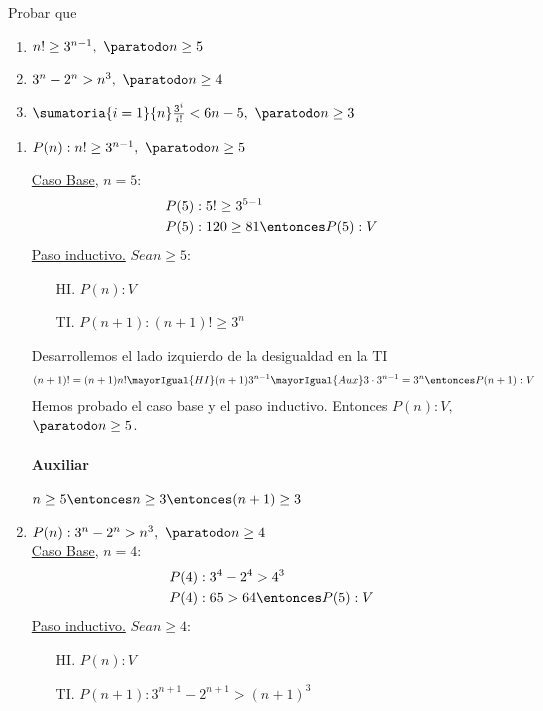\begin{enunciado}{\ejercicio}
  Probar que
  \begin{enumerate}[label=\roman*)]
    \item $n! \geq 3^{n-1}, \ \paratodo n \geq 5$
    \item $3^n - 2^n > n^3, \ \paratodo n \geq 4$
    \item $ \sumatoria{i=1}{n} \frac{3^i}{i!} < 6n - 5, \ \paratodo n \geq 3$
  \end{enumerate}
\end{enunciado}

\begin{enumerate}[label=\roman*)]
  \item $P(n): n! \geq 3^{n-1}, \ \paratodo n \geq 5$ \par
        \underline{Caso Base}, $n = 5$:
        \begin{align*}
           & P(5): 5! \geq 3^{5-1}              \\
           & P(5): 120 \geq 81 \entonces P(5):V
        \end{align*}
        \underline{Paso inductivo.} $Sea n \geq 5$:
        \begin{enumerate}
          \item[HI.] $P(n): V$
          \item[TI.] $P(n+1): (n+1)! \geq 3^n$
        \end{enumerate}

        Desarrollemos el lado izquierdo de la desigualdad en la TI
        \begin{align*}
          (n+1)! = (n+1)n! \mayorIgual{HI} (n+1)3^{n-1} \mayorIgual{Aux} 3 \cdot 3^{n-1} = 3^n
          \entonces P(n+1):V
        \end{align*}
        Hemos probado el caso base y el paso inductivo. Entonces $P(n):V,$ $\paratodo n \geq 5$.

        \paragraph{Auxiliar}{$n \geq 5 \entonces n \geq 3 \entonces (n+1) \geq 3$}

  \item $P(n): 3^n - 2^n > n^3, \ \paratodo n \geq 4$ \\
        \underline{Caso Base}, $n = 4$:
        \begin{align*}
           & P(4): 3^4 - 2^4 > 4^3          \\
           & P(4): 65 > 64 \entonces P(5):V
        \end{align*}
        \underline{Paso inductivo.} $Sea n \geq 4$:
        \begin{enumerate}
          \item[HI.] $P(n): V$
          \item[TI.] $P(n+1): 3^{n+1} - 2^{n+1} > (n+1)^3$
        \end{enumerate}


\end{enumerate}
